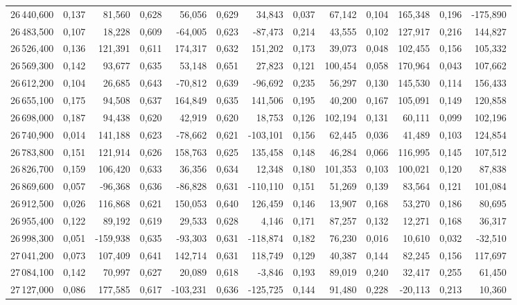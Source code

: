 \begin{longtable}{rrrrrrrrrrrrr}
26\,440,600 & 0,137 & 81,560 & 0,628 & 56,056 & 0,629 & 34,843 & 0,037 & 67,142 & 0,104 & 165,348 & 0,196 & -175,890\\
26\,483,500 & 0,107 & 18,228 & 0,609 & -64,005 & 0,623 & -87,473 & 0,214 & 43,555 & 0,102 & 127,917 & 0,216 & 144,827\\
26\,526,400 & 0,136 & 121,391 & 0,611 & 174,317 & 0,632 & 151,202 & 0,173 & 39,073 & 0,048 & 102,455 & 0,156 & 105,332\\
26\,569,300 & 0,142 & 93,677 & 0,635 & 53,148 & 0,651 & 27,823 & 0,121 & 100,454 & 0,058 & 170,964 & 0,043 & 107,662\\
26\,612,200 & 0,104 & 26,685 & 0,643 & -70,812 & 0,639 & -96,692 & 0,235 & 56,297 & 0,130 & 145,530 & 0,114 & 156,433\\
26\,655,100 & 0,175 & 94,508 & 0,637 & 164,849 & 0,635 & 141,506 & 0,195 & 40,200 & 0,167 & 105,091 & 0,149 & 120,858\\
26\,698,000 & 0,187 & 94,438 & 0,620 & 42,919 & 0,620 & 18,753 & 0,126 & 102,194 & 0,131 & 60,111 & 0,099 & 102,196\\
26\,740,900 & 0,014 & 141,188 & 0,623 & -78,662 & 0,621 & -103,101 & 0,156 & 62,445 & 0,036 & 41,489 & 0,103 & 124,854\\
26\,783,800 & 0,151 & 121,914 & 0,626 & 158,763 & 0,625 & 135,458 & 0,148 & 46,284 & 0,066 & 116,995 & 0,145 & 107,512\\
26\,826,700 & 0,159 & 106,420 & 0,633 & 36,356 & 0,634 & 12,348 & 0,180 & 101,353 & 0,103 & 100,021 & 0,120 & 87,838\\
26\,869,600 & 0,057 & -96,368 & 0,636 & -86,828 & 0,631 & -110,110 & 0,151 & 51,269 & 0,139 & 83,564 & 0,121 & 101,084\\
26\,912,500 & 0,026 & 116,868 & 0,621 & 150,053 & 0,640 & 126,459 & 0,146 & 13,907 & 0,168 & 53,270 & 0,186 & 80,695\\
26\,955,400 & 0,122 & 89,192 & 0,619 & 29,533 & 0,628 & 4,146 & 0,171 & 87,257 & 0,132 & 12,271 & 0,168 & 36,317\\
26\,998,300 & 0,051 & -159,938 & 0,635 & -93,303 & 0,631 & -118,874 & 0,182 & 76,230 & 0,016 & 10,610 & 0,032 & -32,510\\
27\,041,200 & 0,073 & 107,409 & 0,641 & 142,714 & 0,631 & 118,749 & 0,129 & 40,387 & 0,144 & 82,245 & 0,156 & 117,697\\
27\,084,100 & 0,142 & 70,997 & 0,627 & 20,089 & 0,618 & -3,846 & 0,193 & 89,019 & 0,240 & 32,417 & 0,255 & 61,450\\
27\,127,000 & 0,086 & 177,585 & 0,617 & -103,231 & 0,636 & -125,725 & 0,144 & 91,480 & 0,228 & -20,113 & 0,213 & 10,360\\

\end{longtable}
